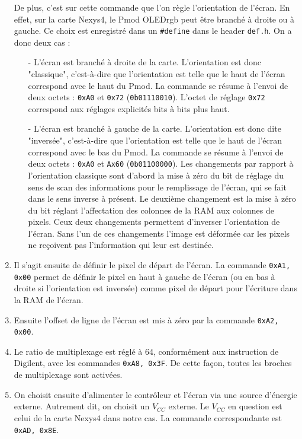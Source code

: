 \documentclass[11pt]{article}
\begin{document}
\begin{enumerate}
    De plus, c'est sur cette commande que l'on règle l'orientation de l'écran. En effet, sur la carte Nexys4, le Pmod OLEDrgb peut être branché à droite ou à gauche. Ce choix est enregistré dans un \texttt{\#define} dans le header \texttt{def.h}. On a donc deux cas : 
    \begin{itemize}
        \item[-] L'écran est branché à droite de la carte. L'orientation est donc "classique", c'est-à-dire que l'orientation est telle que le haut de l'écran correspond avec le haut du Pmod. La commande se résume à l'envoi de deux octets : \texttt{0xA0} et \texttt{0x72} (\texttt{0b01110010}). L'octet de réglage \texttt{0x72} correspond aux réglages explicités bits à bits plus haut. 
        \item[-] L'écran est branché à gauche de la carte. L'orientation est donc dite "inversée", c'est-à-dire que l'orientation est telle que le haut de l'écran correspond avec le bas du Pmod. La commande se résume à l'envoi de deux octets : \texttt{0xA0} et \texttt{Ax60} (\texttt{0b01100000}). Les changements par rapport à l'orientation classique sont d'abord la mise à zéro du bit de réglage du sens de scan des informations pour le remplissage de l'écran, qui se fait dans le sens inverse à présent. Le deuxième changement est la mise à zéro du bit réglant l'affectation des colonnes de la RAM aux colonnes de pixels. Ceux deux changements permettent d'inverser l'orientation de l'écran. Sans l'un de ces changements l'image est déformée car les pixels ne reçoivent pas l'information qui leur est destinée. 
    \end{itemize}

    \item Il s'agit ensuite de définir le pixel de départ de l'écran. La commande \texttt{0xA1, 0x00} permet de définir le pixel en haut à gauche de l'écran (ou en bas à droite si l'orientation est inversée) comme pixel de départ pour l’écriture dans la RAM de l'écran. 

    \item Ensuite l'offset de ligne de l'écran est mis à zéro par la commande \texttt{0xA2, 0x00}. 

    \item Le ratio de multiplexage est réglé à 64, conformément aux instruction de Digilent, avec les commandes \texttt{0xA8, 0x3F}. De cette façon, toutes les broches de multiplexage sont activées. 

    \item On choisit ensuite d'alimenter le contrôleur et l'écran via une source d'énergie externe. Autrement dit, on choisit un $V_{CC}$ externe. Le $V_{CC}$ en question est celui de la carte Nexys4 dans notre cas. La commande correspondante est \texttt{0xAD, 0x8E}. 


\end{enumerate}
\end{document}
